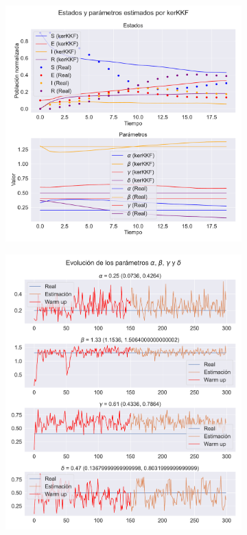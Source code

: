 \begin{figure}[h]
    \centering
    \begin{subfigure}[b]{0.49\textwidth}
         \includegraphics[height=0.9\linewidth]{img/content/chapter4/nonlinear_filters_seir_params.pdf}
         \caption{}
         \label{fig:nonlinear_filters_sir_rec_params}
    \end{subfigure}
    \begin{subfigure}[b]{0.49\textwidth}
         \includegraphics[height=0.9\linewidth]{img/content/chapter4/nonlinear_filters_seir_params_evolution.pdf}

\end{subfigure}
\end{figure}
